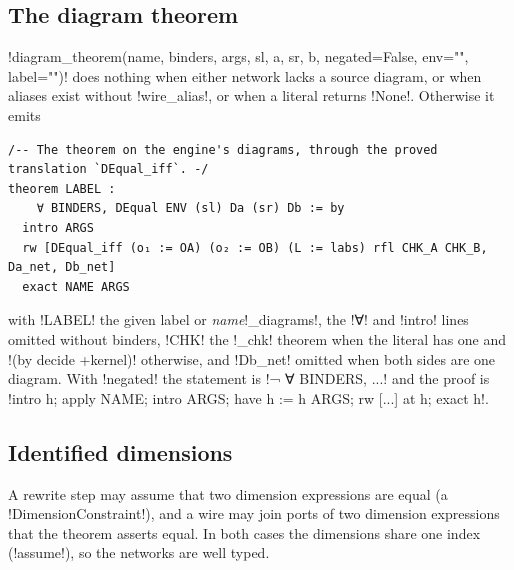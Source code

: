 {\subsection{The diagram theorem}\label{sec:lean-export-net-diagram-theorem}

\py!diagram_theorem(name, binders, args, sl, a, sr, b, negated=False, env="", label="")! does
nothing when either network lacks a source diagram, or when aliases exist without
\py!wire_alias!, or when a literal returns \py!None!. Otherwise it emits
\begin{lstlisting}[style=grammar]
/-- The theorem on the engine's diagrams, through the proved translation `DEqual_iff`. -/
theorem LABEL :
    ∀ BINDERS, DEqual ENV (sl) Da (sr) Db := by
  intro ARGS
  rw [DEqual_iff (o₁ := OA) (o₂ := OB) (L := labs) rfl CHK_A CHK_B, Da_net, Db_net]
  exact NAME ARGS
\end{lstlisting}
with \code!LABEL! the given label or \textit{name}\code!_diagrams!, the \code!∀! and
\code!intro! lines omitted without binders, \code!CHK! the \code!_chk! theorem when the
literal has one and \code!(by decide +kernel)! otherwise, and \code!Db_net! omitted when both
sides are one diagram. With \py!negated! the statement is \code!¬ ∀ BINDERS, ...! and the proof is
\code!intro h; apply NAME; intro ARGS; have h := h ARGS; rw [...] at h; exact h!.

\subsection{Identified dimensions}\label{sec:lean-export-net-identified}

A rewrite step may assume that two dimension expressions are equal (a
\py!DimensionConstraint!), and a wire may join ports of two dimension expressions that the
theorem asserts equal. In both cases the dimensions share one index (\py!assume!), so the
networks are well typed.

}
